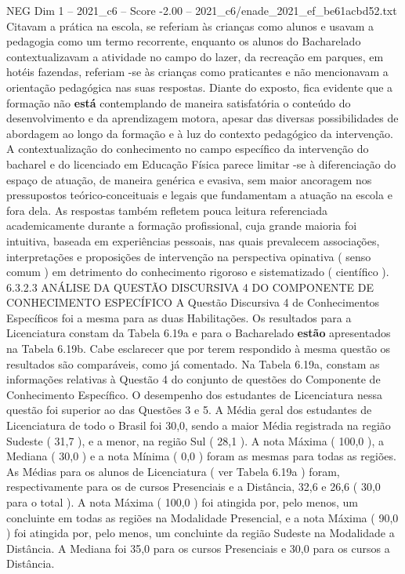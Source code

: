 \begin{textsample}{NEG Dim 1 – 2021\_c6 – Score -2.00 – 2021\_c6/enade\_2021\_ef\_be61acbd52.txt}
Citavam a prática na escola, se referiam às crianças como alunos e usavam a pedagogia como um termo recorrente, enquanto os alunos do Bacharelado contextualizavam a atividade no campo do lazer, da recreação em parques, em hotéis fazendas, referiam -se às crianças como praticantes e não mencionavam a orientação pedagógica nas suas respostas.
Diante do exposto, fica evidente que a formação não \textbf{está} contemplando de maneira satisfatória o conteúdo do desenvolvimento e da aprendizagem motora, apesar das diversas possibilidades de abordagem ao longo da formação e à luz do contexto pedagógico da intervenção.
A contextualização do conhecimento no campo específico da intervenção do bacharel e do licenciado em Educação Física parece limitar -se à diferenciação do espaço de atuação, de maneira genérica e evasiva, sem maior ancoragem nos pressupostos teórico-conceituais e legais que fundamentam a atuação na escola e fora dela.
As respostas também refletem pouca leitura referenciada academicamente durante a formação profissional, cuja grande maioria foi intuitiva, baseada em experiências pessoais, nas quais prevalecem associações, interpretações e proposições de intervenção na perspectiva opinativa ( senso comum ) em detrimento do conhecimento rigoroso e sistematizado ( científico ). 6.3.2.3 ANÁLISE DA QUESTÃO DISCURSIVA 4 DO COMPONENTE DE CONHECIMENTO ESPECÍFICO A Questão Discursiva 4 de Conhecimentos Específicos foi a mesma para as duas Habilitações.
Os resultados para a Licenciatura constam da Tabela 6.19a e para o Bacharelado \textbf{estão} apresentados na Tabela 6.19b.
Cabe esclarecer que por terem respondido à mesma questão os resultados são comparáveis, como já comentado.
Na Tabela 6.19a, constam as informações relativas à Questão 4 do conjunto de questões do Componente de Conhecimento Específico.
O desempenho dos estudantes de Licenciatura nessa questão foi superior ao das Questões 3 e 5.
A Média geral dos estudantes de Licenciatura de todo o Brasil foi 30,0, sendo a maior Média registrada na região Sudeste ( 31,7 ), e a menor, na região Sul ( 28,1 ).
A nota Máxima ( 100,0 ), a Mediana ( 30,0 ) e a nota Mínima ( 0,0 ) foram as mesmas para todas as regiões.
As Médias para os alunos de Licenciatura ( ver Tabela 6.19a ) foram, respectivamente para os de cursos Presenciais e a Distância, 32,6 e 26,6 ( 30,0 para o total ).
A nota Máxima ( 100,0 ) foi atingida por, pelo menos, um concluinte em todas as regiões na Modalidade Presencial, e a nota Máxima ( 90,0 ) foi atingida por, pelo menos, um concluinte da região Sudeste na Modalidade a Distância.
A Mediana foi 35,0 para os cursos Presenciais e 30,0 para os cursos a Distância.

\end{textsample}
